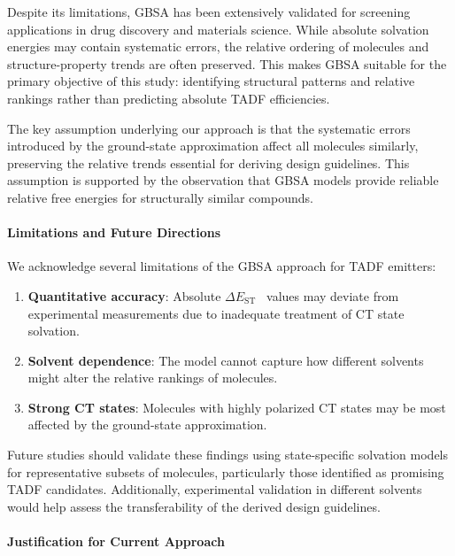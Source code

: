\documentclass[journal=jcisd8,manuscript=article,keywords=true]{achemso}
\newcommand{\deltaest}{$\Delta E_{\text{ST}}$}
\begin{document}
Despite its limitations, GBSA has been extensively validated for screening applications in drug discovery and materials science.\cite{Genheden2015} While absolute solvation energies may contain systematic errors, the relative ordering of molecules and structure-property trends are often preserved. This makes GBSA suitable for the primary objective of this study: identifying structural patterns and relative rankings rather than predicting absolute TADF efficiencies.

The key assumption underlying our approach is that the systematic errors introduced by the ground-state approximation affect all molecules similarly, preserving the relative trends essential for deriving design guidelines. This assumption is supported by the observation that GBSA models provide reliable relative free energies for structurally similar compounds.\cite{Genheden2015}

\paragraph{Limitations and Future Directions}

We acknowledge several limitations of the GBSA approach for TADF emitters:

\begin{enumerate}
\item \textbf{Quantitative accuracy}: Absolute \deltaest~ values may deviate from experimental measurements due to inadequate treatment of CT state solvation.
\item \textbf{Solvent dependence}: The model cannot capture how different solvents might alter the relative rankings of molecules.
\item \textbf{Strong CT states}: Molecules with highly polarized CT states may be most affected by the ground-state approximation.
\end{enumerate}

Future studies should validate these findings using state-specific solvation models for representative subsets of molecules, particularly those identified as promising TADF candidates. Additionally, experimental validation in different solvents would help assess the transferability of the derived design guidelines.

\paragraph{Justification for Current Approach}
\end{document}
